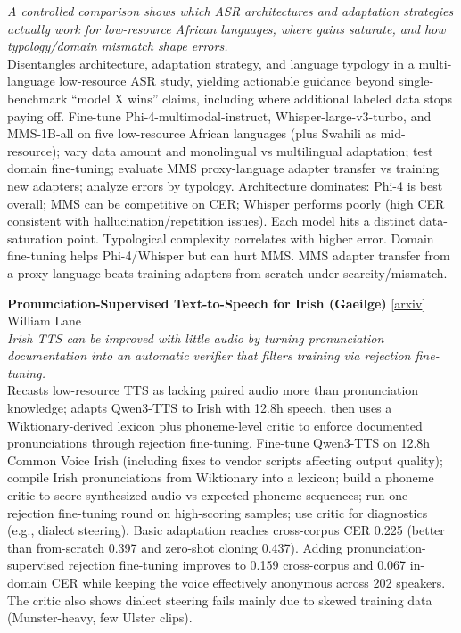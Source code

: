 \documentclass[12pt,letterpaper]{article}
\begin{document}
{\small\textit{A controlled comparison shows which ASR architectures and adaptation strategies actually work for low-resource African languages, where gains saturate, and how typology/domain mismatch shape errors.}}\\[1pt]
{\footnotesize Disentangles architecture, adaptation strategy, and language typology in a multi-language low-resource ASR study, yielding actionable guidance beyond single-benchmark ``model X wins'' claims, including where additional labeled data stops paying off. Fine-tune Phi-4-multimodal-instruct, Whisper-large-v3-turbo, and MMS-1B-all on five low-resource African languages (plus Swahili as mid-resource); vary data amount and monolingual vs multilingual adaptation; test domain fine-tuning; evaluate MMS proxy-language adapter transfer vs training new adapters; analyze errors by typology. Architecture dominates: Phi-4 is best overall; MMS can be competitive on CER; Whisper performs poorly (high CER consistent with hallucination/repetition issues). Each model hits a distinct data-saturation point. Typological complexity correlates with higher error. Domain fine-tuning helps Phi-4/Whisper but can hurt MMS. MMS adapter transfer from a proxy language beats training adapters from scratch under scarcity/mismatch.}

\medskip

{\small\textbf{Pronunciation-Supervised Text-to-Speech for Irish (Gaeilge)}} {\scriptsize[\href{https://arxiv.org/abs/2610.38384}{arxiv}]}\\
{\scriptsize William Lane}\\

{\small\textit{Irish TTS can be improved with little audio by turning pronunciation documentation into an automatic verifier that filters training via rejection fine-tuning.}}\\[1pt]
{\footnotesize Recasts low-resource TTS as lacking paired audio more than pronunciation knowledge; adapts Qwen3-TTS to Irish with 12.8h speech, then uses a Wiktionary-derived lexicon plus phoneme-level critic to enforce documented pronunciations through rejection fine-tuning. Fine-tune Qwen3-TTS on 12.8h Common Voice Irish (including fixes to vendor scripts affecting output quality); compile Irish pronunciations from Wiktionary into a lexicon; build a phoneme critic to score synthesized audio vs expected phoneme sequences; run one rejection fine-tuning round on high-scoring samples; use critic for diagnostics (e.g., dialect steering). Basic adaptation reaches cross-corpus CER 0.225 (better than from-scratch 0.397 and zero-shot cloning 0.437). Adding pronunciation-supervised rejection fine-tuning improves to 0.159 cross-corpus and 0.067 in-domain CER while keeping the voice effectively anonymous across 202 speakers. The critic also shows dialect steering fails mainly due to skewed training data (Munster-heavy, few Ulster clips).}
\end{document}

